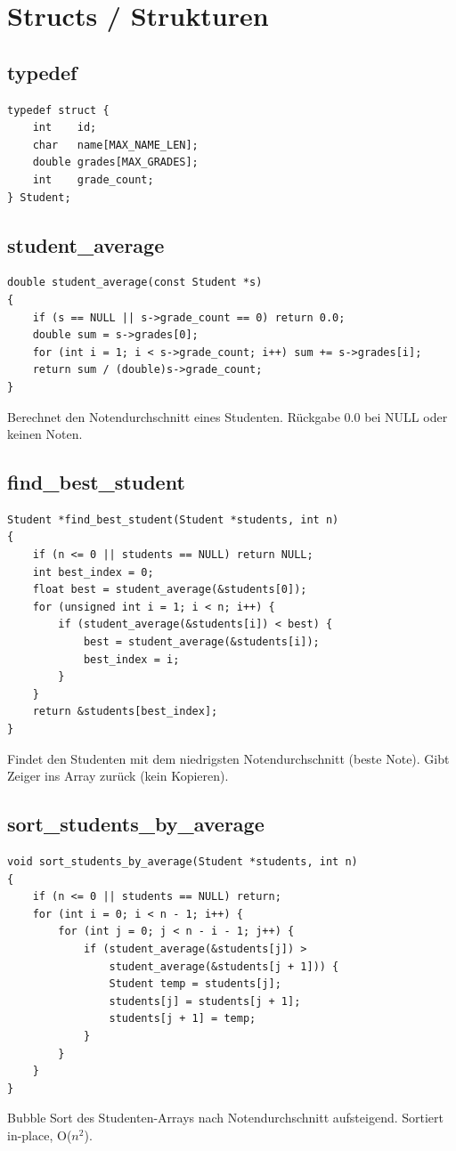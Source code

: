 \documentclass[10pt, a4paper]{article}
\begin{document}
\newpage
\section{Structs / Strukturen}

\subsection{typedef}
\begin{lstlisting}
typedef struct {
    int    id;
    char   name[MAX_NAME_LEN];
    double grades[MAX_GRADES];
    int    grade_count;
} Student;
\end{lstlisting}

\subsection{student\_average}
\begin{lstlisting}
double student_average(const Student *s)
{
    if (s == NULL || s->grade_count == 0) return 0.0;
    double sum = s->grades[0];
    for (int i = 1; i < s->grade_count; i++) sum += s->grades[i];
    return sum / (double)s->grade_count;
}
\end{lstlisting}
Berechnet den Notendurchschnitt eines Studenten. R\"uckgabe 0.0 bei NULL oder keinen Noten.

\subsection{find\_best\_student}
\begin{lstlisting}
Student *find_best_student(Student *students, int n)
{
    if (n <= 0 || students == NULL) return NULL;
    int best_index = 0;
    float best = student_average(&students[0]);
    for (unsigned int i = 1; i < n; i++) {
        if (student_average(&students[i]) < best) {
            best = student_average(&students[i]);
            best_index = i;
        }
    }
    return &students[best_index];
}
\end{lstlisting}
Findet den Studenten mit dem niedrigsten Notendurchschnitt (beste Note). Gibt Zeiger ins Array zur\"uck (kein Kopieren).

\subsection{sort\_students\_by\_average}
\begin{lstlisting}
void sort_students_by_average(Student *students, int n)
{
    if (n <= 0 || students == NULL) return;
    for (int i = 0; i < n - 1; i++) {
        for (int j = 0; j < n - i - 1; j++) {
            if (student_average(&students[j]) >
                student_average(&students[j + 1])) {
                Student temp = students[j];
                students[j] = students[j + 1];
                students[j + 1] = temp;
            }
        }
    }
}
\end{lstlisting}
Bubble Sort des Studenten-Arrays nach Notendurchschnitt aufsteigend. Sortiert in-place, O($n^2$).
\end{document}
